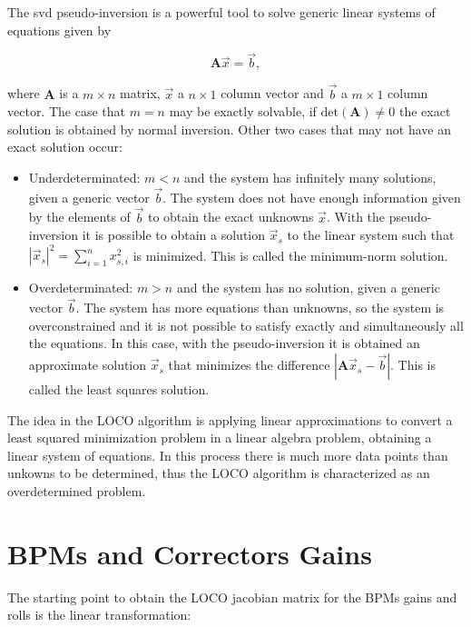 The \gls{svd} pseudo-inversion is a powerful tool to solve generic linear systems of equations given by

\begin{equation}
    \mathbf{A} \vec{x} = \vec{b},
    \label{eq:linear_system}
\end{equation}

where $\mathbf{A}$ is a $m \times n$ matrix, $\vec{x}$ a $n \times 1$ column vector and $\vec{b}$ a $m \times 1$ column vector. The case that $m=n$ may be exactly solvable, if $\mathrm{det}\left(\mathbf{A}\right) \neq 0$ the exact solution is obtained by normal inversion. Other two cases that may not have an exact solution occur:

\begin{itemize}
    \item Underdeterminated: $m < n$ and the system has infinitely many solutions, given a generic vector $\vec{b}$. The system does not have enough information given by the elements of $\vec{b}$ to obtain the exact unknowns $\vec{x}$. With the pseudo-inversion it is possible to obtain a solution $\vec{x}_s$ to the linear system such that $|\vec{x}_s|^2 = \sum_{i=1}^{n}x^2_{s, i}$ is minimized. This is called the minimum-norm solution.
    
    \item Overdeterminated: $m > n$ and the system has no solution, given a generic vector $\vec{b}$. The system has more equations than unknowns, so the system is overconstrained and it is not possible to satisfy exactly and simultaneously all the equations. In this case, with the pseudo-inversion it is obtained an approximate solution $\vec{x}_s$ that minimizes the difference $|\mathbf{A}\vec{x}_s - \vec{b}|$. This is called the least squares solution.
\end{itemize}

The idea in the LOCO algorithm is applying linear approximations to convert a least squared minimization problem in a linear algebra problem, obtaining a linear system of equations. In this process there is much more data points than unkowns to be determined, thus the LOCO algorithm is characterized as an overdetermined problem.

\chapter{BPMs and Correctors Gains}\label{appendix:gains}

The starting point to obtain the LOCO jacobian matrix for the BPMs gains and rolls is the linear transformation:

